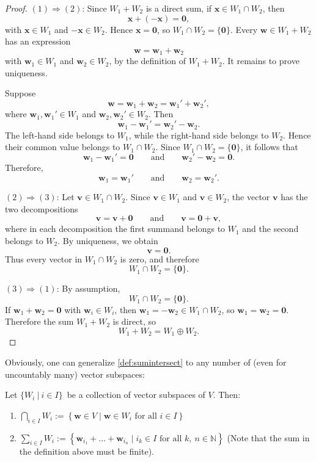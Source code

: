 \begin{proof}
\noindent
\((1)\Rightarrow(2)\):
Since \(W_1+W_2\) is a direct sum, if \(\mathbf{x}\in W_1\cap W_2\), then
\[
\mathbf{x}+(-\mathbf{x})=\mathbf{0},
\]
with \(\mathbf{x}\in W_1\) and \(-\mathbf{x}\in W_2\). Hence \(\mathbf{x}=\mathbf{0}\), so \(W_1\cap W_2=\{\mathbf{0}\}\).
Every \(\mathbf w\in W_1+W_2\) has an expression
\[
\mathbf w=\mathbf w_1+\mathbf w_2
\]
with \(\mathbf w_1\in W_1\) and \(\mathbf w_2\in W_2\), by the definition
of \(W_1+W_2\). It remains to prove uniqueness.

Suppose
\[
\mathbf w=\mathbf w_1+\mathbf w_2
          =\mathbf w_1'+\mathbf w_2',
\]
where \(\mathbf w_1,\mathbf w_1'\in W_1\) and
\(\mathbf w_2,\mathbf w_2'\in W_2\). Then
\[
\mathbf w_1-\mathbf w_1'
=
\mathbf w_2'-\mathbf w_2.
\]
The left-hand side belongs to \(W_1\), while the right-hand side belongs
to \(W_2\). Hence their common value belongs to \(W_1\cap W_2\). Since
\(W_1\cap W_2=\{\mathbf 0\}\), it follows that
\[
\mathbf w_1-\mathbf w_1'=\mathbf 0
\qquad\text{and}\qquad
\mathbf w_2'-\mathbf w_2=\mathbf 0.
\]
Therefore,
\[
\mathbf w_1=\mathbf w_1'
\qquad\text{and}\qquad
\mathbf w_2=\mathbf w_2'.
\]

\medskip
\noindent
\((2)\Rightarrow(3)\):
Let \(\mathbf v\in W_1\cap W_2\). Since \(\mathbf v\in W_1\) and
\(\mathbf v\in W_2\), the vector \(\mathbf v\) has the two decompositions
\[
\mathbf v=\mathbf v+\mathbf 0
\qquad\text{and}\qquad
\mathbf v=\mathbf 0+\mathbf v,
\]
where in each decomposition the first summand belongs to \(W_1\) and
the second belongs to \(W_2\). By uniqueness, we obtain
\[
\mathbf v=\mathbf 0.
\]
Thus every vector in \(W_1\cap W_2\) is zero, and therefore
\[
W_1\cap W_2=\{\mathbf 0\}.
\]

\medskip
\noindent
\((3)\Rightarrow(1)\):
By assumption,
\[
W_1\cap W_2=\{\mathbf 0\}.
\]
If \(\mathbf{w}_1+\mathbf{w}_2=\mathbf{0}\) with \(\mathbf{w}_i\in W_i\), then \(\mathbf{w}_1=-\mathbf{w}_2\in W_1\cap W_2\), so \(\mathbf{w}_1=\mathbf{w}_2=\mathbf{0}\). Therefore the sum \(W_1+W_2\) is direct, so
\[
W_1+W_2=W_1\oplus W_2.
\]
\end{proof}

Obviously, one can generalize \autoref{def:sumintersect} to any number of (even for uncountably many) vector subspaces:
\begin{definition}
 Let \(\{W_i\ |\ i \in I\}\)\ be a collection of vector subspaces of \(V\). Then:

\begin{enumerate}
  \item \(\bigcap_{i \in I} W_i  := \left\{ \mathbf{w} \in V \mid \mathbf{w} \in W_i \text{ for all } i \in I \right\}\)

  \item \(\sum_{i \in I} W_i  := \left\{ \mathbf{w}_{i_1} + \dots + \mathbf{w}_{i_n} \mid i_k \in I \text{ for all } k,\ n \in \mathbb{N} \right\}\) (Note that the sum in the definition above must be finite).
\end{enumerate}   
\end{definition}
 

